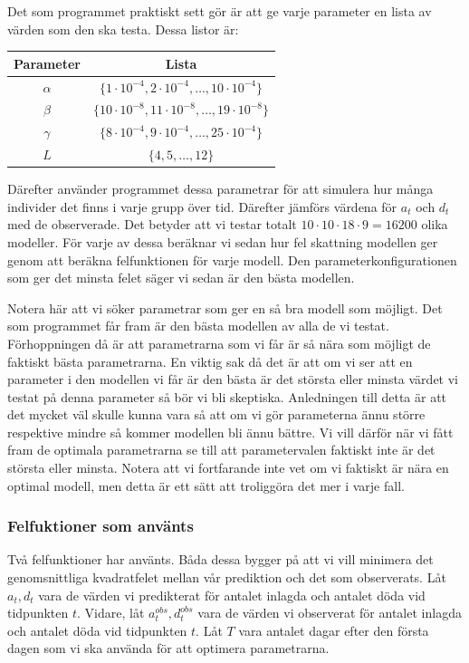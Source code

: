 \documentclass[a4paper, 12pt]{article}
\theoremstyle{definition}
\begin{document}
Det som programmet praktiskt sett gör är att ge varje parameter en lista av värden som den ska testa. Dessa listor är:
\begin{center}
  \begin{tabular}{c | c}
    \textbf{Parameter} & \textbf{Lista} \\ \hline
    $\alpha$ & $\{ 1\cdot10^{-4},2\cdot10^{-4},\ldots,10\cdot10^{-4}\}$ \\ \hline
    $\beta$ & $\{ 10\cdot10^{-8},11\cdot10^{-8},\ldots,19\cdot10^{-8} \}$ \\ \hline
    $\gamma$ & $\{ 8\cdot10^{-4},9\cdot10^{-4},\ldots,25\cdot10^{-4} \}$ \\ \hline
    $L$ & $\{ 4,5,\ldots,12 \}$
  \end{tabular}
\end{center}
Därefter använder programmet dessa parametrar för att simulera hur många individer det finns i varje grupp över tid. Därefter jämförs värdena för $a_t$ och $d_t$ med de observerade. Det betyder att vi testar totalt $10\cdot 10\cdot 18\cdot 9=16200$ olika modeller. För varje av dessa beräknar vi sedan hur fel skattning modellen ger genom att beräkna felfunktionen för varje modell. Den parameterkonfigurationen som ger det minsta felet säger vi sedan är den bästa modellen.

Notera här att vi söker parametrar som ger en så bra modell som möjligt. Det som programmet får fram är den bästa modellen av alla de vi testat. Förhoppningen då är att parametrarna som vi får är så nära som möjligt de faktiskt bästa parametrarna. En viktig sak då det är att om vi ser att en parameter i den modellen vi får är den bästa är det största eller minsta värdet vi testat på denna parameter så bör vi bli skeptiska. Anledningen till detta är att det mycket väl skulle kunna vara så att om vi gör parameterna ännu större respektive mindre så kommer modellen bli ännu bättre. Vi vill därför när vi fått fram de optimala parametrarna se till att parametervalen faktiskt inte är det största eller minsta. Notera att vi fortfarande inte vet om vi faktiskt är nära en optimal modell, men detta är ett sätt att troliggöra det mer i varje fall.

\subsubsection{Felfuktioner som använts}\label{Subsub: felfunktioner}
Två felfunktioner har använts. Båda dessa bygger på att vi vill minimera det genomsnittliga kvadratfelet mellan vår prediktion och det som observerats. Låt $a_t,d_t$ vara de värden vi predikterat för antalet inlagda och antalet döda vid tidpunkten $t$. Vidare, låt $a_t^{obs},d_t^{obs}$ vara de värden vi observerat för antalet inlagda och antalet döda vid tidpunkten $t$. Låt $T$ vara antalet dagar efter den första dagen som vi ska använda för att optimera parametrarna.
\end{document}
